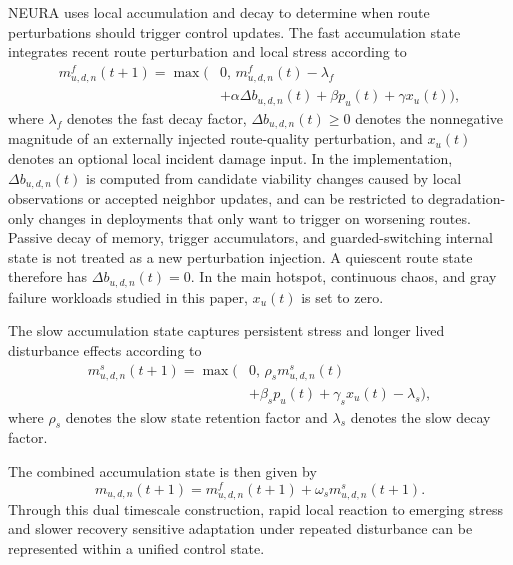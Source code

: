 \documentclass[5p,times]{elsarticle}
\begin{document}
NEURA uses local accumulation and decay to determine when route perturbations should trigger control updates. The fast accumulation state integrates recent route perturbation and local stress according to
\begin{equation}\label{eq:fast-accum}
\begin{aligned}
m^{f}_{u,d,n}(t+1) = \max \Big(&0,\,
m^{f}_{u,d,n}(t) - \lambda_f\\
&+ \alpha \Delta b_{u,d,n}(t)
+ \beta p_u(t)
+ \gamma x_u(t)\Big),
\end{aligned}
\end{equation}
where $\lambda_f$ denotes the fast decay factor, $\Delta b_{u,d,n}(t)\ge 0$ denotes the nonnegative magnitude of an externally injected route-quality perturbation, and $x_u(t)$ denotes an optional local incident damage input. In the implementation, $\Delta b_{u,d,n}(t)$ is computed from candidate viability changes caused by local observations or accepted neighbor updates, and can be restricted to degradation-only changes in deployments that only want to trigger on worsening routes. Passive decay of memory, trigger accumulators, and guarded-switching internal state is not treated as a new perturbation injection. A quiescent route state therefore has $\Delta b_{u,d,n}(t)=0$. In the main hotspot, continuous chaos, and gray failure workloads studied in this paper, $x_u(t)$ is set to zero.

The slow accumulation state captures persistent stress and longer lived disturbance effects according to
\begin{equation}\label{eq:slow-accum}
\begin{aligned}
m^{s}_{u,d,n}(t+1) = \max \Big(&0,\,
\rho_s m^{s}_{u,d,n}(t)\\
&+ \beta_s p_u(t)
+ \gamma_s x_u(t)
- \lambda_s\Big),
\end{aligned}
\end{equation}
where $\rho_s$ denotes the slow state retention factor and $\lambda_s$ denotes the slow decay factor.

The combined accumulation state is then given by
\begin{equation}\label{eq:combined-accum}
m_{u,d,n}(t+1) = m^{f}_{u,d,n}(t+1) + \omega_s m^{s}_{u,d,n}(t+1).
\end{equation}
Through this dual timescale construction, rapid local reaction to emerging stress and slower recovery sensitive adaptation under repeated disturbance can be represented within a unified control state.
\end{document}
